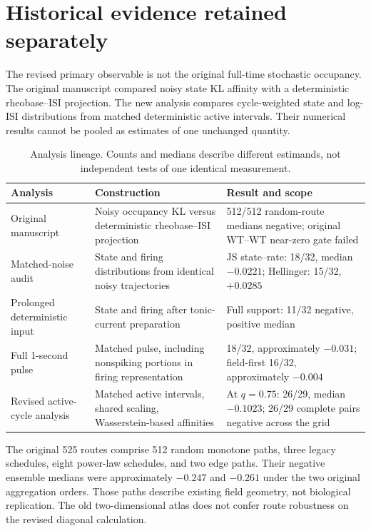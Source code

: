 \documentclass[11pt,a4paper]{article}
\begin{document}
\section{Historical evidence retained separately}\label{s:history}
The revised primary observable is not the original full-time stochastic occupancy. The original manuscript compared noisy state KL affinity with a deterministic rheobase--ISI projection. The new analysis compares cycle-weighted state and log-ISI distributions from matched deterministic active intervals. Their numerical results cannot be pooled as estimates of one unchanged quantity.

\begin{table}[htbp]\centering\small
\caption{Analysis lineage. Counts and medians describe different estimands, not independent tests of one identical measurement.}
\begin{tabularx}{\textwidth}{@{}p{}p{}X@{}}\toprule Analysis&Construction&Result and scope\\\midrule
Original manuscript&Noisy occupancy KL versus deterministic rheobase--ISI projection&512/512 random-route medians negative; original WT--WT near-zero gate failed\\
Matched-noise audit&State and firing distributions from identical noisy trajectories&JS state--rate: 18/32, median $-0.0221$; Hellinger: 15/32, $+0.0285$\\
Prolonged deterministic input&State and firing after tonic-current preparation&Full support: 11/32 negative, positive median\\
Full 1-second pulse&Matched pulse, including nonspiking portions in firing representation&18/32, approximately $-0.031$; field-first 16/32, approximately $-0.004$\\
Revised active-cycle analysis&Matched active intervals, shared scaling, Wasserstein-based affinities&At $q=0.75$: 26/29, median $-0.1023$; 26/29 complete pairs negative across the grid\\\bottomrule\end{tabularx}\end{table}

The original 525 routes comprise 512 random monotone paths, three legacy schedules, eight power-law schedules, and two edge paths. Their negative ensemble medians were approximately $-0.247$ and $-0.261$ under the two original aggregation orders. Those paths describe existing field geometry, not biological replication. The old two-dimensional atlas does not confer route robustness on the revised diagonal calculation.
\end{document}
